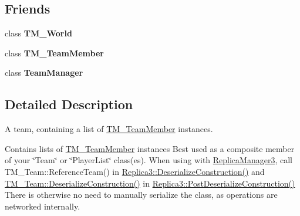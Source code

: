 \subsection*{Friends}
\begin{DoxyCompactItemize}
\item 
\hypertarget{class_rak_net_1_1_t_m___team_a1c849d724e23da543213088c6bc98353}{class {\bfseries T\-M\-\_\-\-World}}\label{class_rak_net_1_1_t_m___team_a1c849d724e23da543213088c6bc98353}

\item 
\hypertarget{class_rak_net_1_1_t_m___team_a11ad3f6dfe86143c6914f3aae4e553a7}{class {\bfseries T\-M\-\_\-\-Team\-Member}}\label{class_rak_net_1_1_t_m___team_a11ad3f6dfe86143c6914f3aae4e553a7}

\item 
\hypertarget{class_rak_net_1_1_t_m___team_afa7230b4b3ca79f8b3b50b4b5ae6034a}{class {\bfseries Team\-Manager}}\label{class_rak_net_1_1_t_m___team_afa7230b4b3ca79f8b3b50b4b5ae6034a}

\end{DoxyCompactItemize}


\subsection{Detailed Description}
A team, containing a list of \hyperlink{class_rak_net_1_1_t_m___team_member}{T\-M\-\_\-\-Team\-Member} instances. 

Contains lists of \hyperlink{class_rak_net_1_1_t_m___team_member}{T\-M\-\_\-\-Team\-Member} instances Best used as a composite member of your \char`\"{}\-Team\char`\"{} or \char`\"{}\-Player\-List\char`\"{} class(es). When using with \hyperlink{class_rak_net_1_1_replica_manager3}{Replica\-Manager3}, call T\-M\-\_\-\-Team\-::\-Reference\-Team() in \hyperlink{class_rak_net_1_1_replica3_a8e18c95612054b601ce0149f91a5a34d}{Replica3\-::\-Deserialize\-Construction()} and \hyperlink{class_rak_net_1_1_t_m___team_a67edfd216d56e072201e455061403d2a}{T\-M\-\_\-\-Team\-::\-Deserialize\-Construction()} in \hyperlink{class_rak_net_1_1_replica3_a7d612c095fa5d81c1c6fabaa1a0f2501}{Replica3\-::\-Post\-Deserialize\-Construction()} There is otherwise no need to manually serialize the class, as operations are networked internally. 

